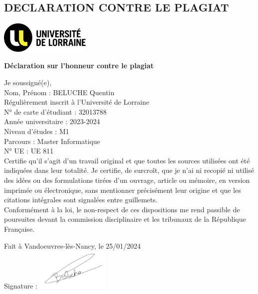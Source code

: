 \thispagestyle{empty} %
\begin{center}
    \section{\huge\textbf{{DECLARATION CONTRE LE PLAGIAT}}}
\end{center}

\includegraphics[height=1.5cm]{images/univ_lorraine.png}
\begin{center}
    \normalsize\textbf{Déclaration sur l’honneur contre le plagiat}
\end{center}
\normalsize{Je soussigné(e),}\\[0.5cm]
\normalsize{Nom, Prénom : BELUCHE Quentin}\\[0.5cm]
\normalsize{Régulièrement inscrit à l’Université de Lorraine}\\
\normalsize{N° de carte d’étudiant : 32013788}\\
\normalsize{Année universitaire : 2023-2024}\\
\normalsize{Niveau d’études : M1}\\
\normalsize{Parcours : Master Informatique}\\
\normalsize{N° UE : UE 811}\\[0.5cm]
\normalsize{Certifie qu’il s’agit d’un travail original et que toutes les sources utilisées ont été indiquées dans leur totalité. Je certifie, de surcroît, que je n’ai ni recopié ni utilisé des idées ou des formulations tirées d’un ouvrage, article ou mémoire, en version imprimée ou électronique, sans mentionner précisément leur origine et que les citations intégrales sont signalées entre guillemets.}\\[0.5cm]
\normalsize{Conformément à la loi, le non-respect de ces dispositions me rend passible de poursuites    devant la commission disciplinaire et les tribunaux de la République Française.}
\\[1cm]

\begin{flushright}
    \normalsize{Fait à  Vandoeuvres-lès-Nancy, le 25/01/2024}\\[1cm]
    \normalsize{Signature :}
    \includegraphics[height=2cm]{images/signature_quentin.png}
\end{flushright}

